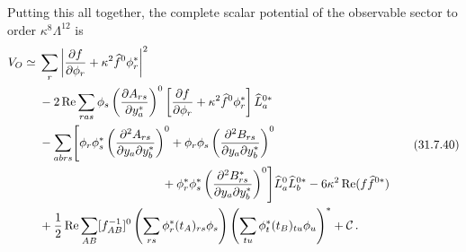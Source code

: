 Putting this all together, the complete scalar potential of the observable
sector to order \(\kappa^8\Lambda^{12}\) is
\begin{equation}
  \begin{aligned}
  V_O\simeq{}&
  \sum_r\left|
    \frac{\partial f}{\partial\phi_r}
    +\kappa^2\widehat f^0\phi_r^*
  \right|^2
  \\
  &-2\operatorname{Re}\sum_{ras}\phi_s
  \left(\frac{\partial A_{rs}}{\partial y_a^*}\right)^0
  \left[
    \frac{\partial f}{\partial\phi_r}
    +\kappa^2\widehat f^0\phi_r^*
  \right]\widehat L_a^{0*}
  \\
  &-\sum_{abrs}\Biggl[
    \phi_r\phi_s^*
    \left(\frac{\partial^2A_{rs}}
      {\partial y_a\partial y_b^*}\right)^0
  +\phi_r\phi_s
    \left(\frac{\partial^2B_{rs}}
      {\partial y_a\partial y_b^*}\right)^0
  \\
  &\hspace{36mm}
  +\phi_r^*\phi_s^*
    \left(\frac{\partial^2B_{rs}^*}
      {\partial y_a\partial y_b^*}\right)^0
  \Biggr]\widehat L_a^0\widehat L_b^{0*}
  -6\kappa^2\operatorname{Re}(f\widehat f^{0*})
  \\
  &+\frac12\operatorname{Re}\sum_{AB}[f_{AB}^{-1}]^0
  \left(\sum_{rs}\phi_r^*(t_A)_{rs}\phi_s\right)
  \left(\sum_{tu}\phi_t^*(t_B)_{tu}\phi_u\right)^*
  +\mathcal C\,.
  \end{aligned}
  \tag{31.7.40}\label{eq:31.7.40}
\end{equation}

